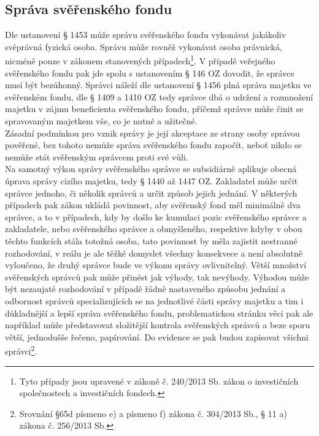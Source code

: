 \documentclass{article}
\begin{document}
\subsection{Správa svěřenského fondu}

Dle ustanovení § 1453 může správu svěřenského fondu vykonávat jakákoliv svéprávná fyzická osoba. Správu může rovněž vykonávat osoba právnická, nicméně pouze v zákonem stanovených případech\footnote{Tyto případy jsou upravené v zákoně č. 240/2013 Sb. zákon o investičních společnostech a investičních fondech.}. V případě veřejného svěřenského fondu pak jde spolu s ustanovením § 146 OZ dovodit, že správce musí být bezúhonný. Správci náleží dle ustanovení § 1456 plná správa majetku ve svěřenském fondu, dle § 1409 a 1410 OZ tedy správce dbá o udržení a rozmnožení majetku v zájmu beneficienta svěřenského fondu, příčemž správce může činit se spravovaným majetkem vše, co je nutné a užitečné.\\

Zásadní podmínkou pro vznik správy je její akceptace ze strany osoby správou pověřené, bez tohoto nemůže správa svěřenského fondu započít, neboť nikdo se nemůže stát svěřenským správcem proti své vůli.\\

Na samotný výkon správy svěřenského správce se subsidiárně aplikuje obecná úprava správy cizího majetku, tedy § 1440 až 1447 OZ. Zakladatel může určit správce jednoho, či několik správců a určit způsob jejich jednání. V některých případech pak zákon ukládá povinnost, aby svěřenský fond měl minimálně dva správce, a to v případech, kdy by došlo ke kumulaci pozic svěřenského správce a zakladatele, nebo svěřenského správce a obmyšleného, respektive kdyby v obou těchto funkcích stála totožná osoba, tato povinnost by měla zajistit nestranné rozhodování, v reálu je ale těžké domyslet všechny konsekvece a není absolutně vyloučeno, že druhý správce bude ve výkonu správy ovlivnitelný. Větší množství svěřenských správců pak může přinést jak výhody, tak nevýhody. Výhodou může být nezaujaté rozhodování v případě řádně nastaveného způsobu jednání a odbornost správců specializujících se na jednotlivé části správy majetku a tim i důkladnější a lepší správa svěřenského fondu, problematickou stránku věci pak ale například může představovat složitější kontrola svěřenských správců a beze sporu větší, jednodušše řečeno, papírování. Do evidence se pak budou zapisovat všichni správci\footnote{Srovnání §65d písmeno e) a písmeno f) zákona č. 304/2013 Sb., § 11 a) zákona č. 256/2013 Sb.}.\\
\end{document}

